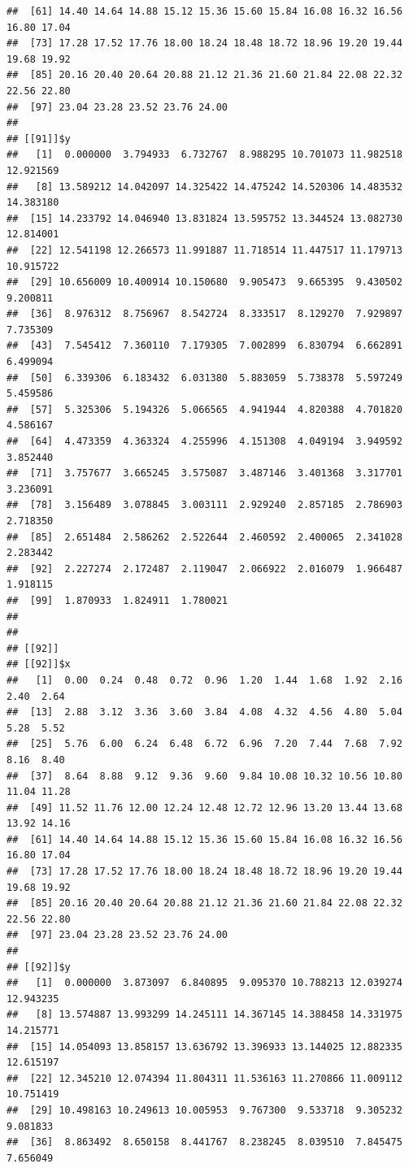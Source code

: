 \documentclass[
  ignorenonframetext,
]{beamer}
\begin{document}
\begin{frame}[fragile]{}
\begin{verbatim}
##  [61] 14.40 14.64 14.88 15.12 15.36 15.60 15.84 16.08 16.32 16.56 16.80 17.04
##  [73] 17.28 17.52 17.76 18.00 18.24 18.48 18.72 18.96 19.20 19.44 19.68 19.92
##  [85] 20.16 20.40 20.64 20.88 21.12 21.36 21.60 21.84 22.08 22.32 22.56 22.80
##  [97] 23.04 23.28 23.52 23.76 24.00
## 
## [[91]]$y
##   [1]  0.000000  3.794933  6.732767  8.988295 10.701073 11.982518 12.921569
##   [8] 13.589212 14.042097 14.325422 14.475242 14.520306 14.483532 14.383180
##  [15] 14.233792 14.046940 13.831824 13.595752 13.344524 13.082730 12.814001
##  [22] 12.541198 12.266573 11.991887 11.718514 11.447517 11.179713 10.915722
##  [29] 10.656009 10.400914 10.150680  9.905473  9.665395  9.430502  9.200811
##  [36]  8.976312  8.756967  8.542724  8.333517  8.129270  7.929897  7.735309
##  [43]  7.545412  7.360110  7.179305  7.002899  6.830794  6.662891  6.499094
##  [50]  6.339306  6.183432  6.031380  5.883059  5.738378  5.597249  5.459586
##  [57]  5.325306  5.194326  5.066565  4.941944  4.820388  4.701820  4.586167
##  [64]  4.473359  4.363324  4.255996  4.151308  4.049194  3.949592  3.852440
##  [71]  3.757677  3.665245  3.575087  3.487146  3.401368  3.317701  3.236091
##  [78]  3.156489  3.078845  3.003111  2.929240  2.857185  2.786903  2.718350
##  [85]  2.651484  2.586262  2.522644  2.460592  2.400065  2.341028  2.283442
##  [92]  2.227274  2.172487  2.119047  2.066922  2.016079  1.966487  1.918115
##  [99]  1.870933  1.824911  1.780021
## 
## 
## [[92]]
## [[92]]$x
##   [1]  0.00  0.24  0.48  0.72  0.96  1.20  1.44  1.68  1.92  2.16  2.40  2.64
##  [13]  2.88  3.12  3.36  3.60  3.84  4.08  4.32  4.56  4.80  5.04  5.28  5.52
##  [25]  5.76  6.00  6.24  6.48  6.72  6.96  7.20  7.44  7.68  7.92  8.16  8.40
##  [37]  8.64  8.88  9.12  9.36  9.60  9.84 10.08 10.32 10.56 10.80 11.04 11.28
##  [49] 11.52 11.76 12.00 12.24 12.48 12.72 12.96 13.20 13.44 13.68 13.92 14.16
##  [61] 14.40 14.64 14.88 15.12 15.36 15.60 15.84 16.08 16.32 16.56 16.80 17.04
##  [73] 17.28 17.52 17.76 18.00 18.24 18.48 18.72 18.96 19.20 19.44 19.68 19.92
##  [85] 20.16 20.40 20.64 20.88 21.12 21.36 21.60 21.84 22.08 22.32 22.56 22.80
##  [97] 23.04 23.28 23.52 23.76 24.00
## 
## [[92]]$y
##   [1]  0.000000  3.873097  6.840895  9.095370 10.788213 12.039274 12.943235
##   [8] 13.574887 13.993299 14.245111 14.367145 14.388458 14.331975 14.215771
##  [15] 14.054093 13.858157 13.636792 13.396933 13.144025 12.882335 12.615197
##  [22] 12.345210 12.074394 11.804311 11.536163 11.270866 11.009112 10.751419
##  [29] 10.498163 10.249613 10.005953  9.767300  9.533718  9.305232  9.081833
##  [36]  8.863492  8.650158  8.441767  8.238245  8.039510  7.845475  7.656049

\end{verbatim}
\end{frame}
\end{document}
